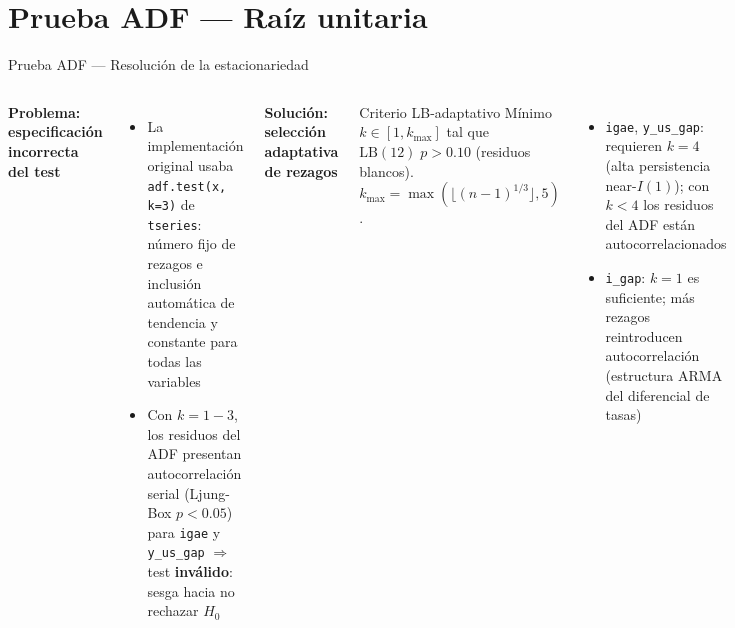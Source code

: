 \documentclass[aspectratio=169, 10pt]{beamer}
\begin{document}
\section{Prueba ADF — Raíz unitaria}

\begin{frame}{Prueba ADF — Resolución de la estacionariedad}

  \begin{columns}[T]

    \textbf{\small Problema: especificación incorrecta del test}
    \vspace{3pt}
    \begin{itemize}\setlength\itemsep{4pt}
      \item La implementación original usaba \texttt{adf.test(x, k=3)} de
            \texttt{tseries}: número fijo de rezagos e inclusión automática de
            tendencia y constante para todas las variables
      \item Con $k=1{-}3$, los \alert{residuos del ADF presentan autocorrelación
            serial} (Ljung-Box $p<0.05$) para \texttt{igae} y \texttt{y\_us\_gap}
            $\Rightarrow$ test \textbf{inválido}: sesga hacia no rechazar $H_0$
    \end{itemize}

    \vspace{4pt}
    \textbf{\small Solución: selección adaptativa de rezagos}
    \vspace{3pt}
    \begin{block}{Criterio LB-adaptativo}
      Mínimo $k \in [1, k_{\max}]$ tal que $\text{LB}(12)\; p > 0.10$
      (residuos blancos). $k_{\max} = \max(\lfloor(n-1)^{1/3}\rfloor, 5)$.
    \end{block}

    \vspace{4pt}
    \begin{itemize}\setlength\itemsep{4pt}
      \item \texttt{igae}, \texttt{y\_us\_gap}: requieren $k=4$ (alta
            persistencia near-$I(1)$); con $k<4$ los residuos del ADF
            están autocorrelacionados
      \item \texttt{i\_gap}: $k=1$ es suficiente; más rezagos
            reintroducen autocorrelación (estructura ARMA del diferencial de tasas)
    \end{itemize}


\end{columns}
\end{frame}
\end{document}
